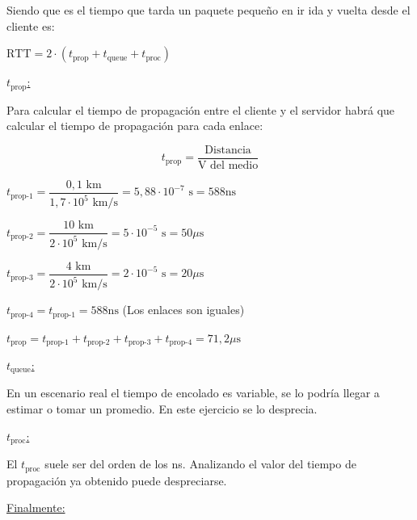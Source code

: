 Siendo que es el tiempo que tarda un paquete pequeño en ir ida y vuelta desde el cliente es:

\vspace{0.5\baselineskip}
\hfil
{\large
$\text{RTT} =
2 \cdot \left(t_{\text{prop}} + t_{\text{queue}} + t_{\text{proc}} \right)$
}
\hfil

{
\noindent\large
\underline{$t_{\text{prop}}$:}
}

\skipline
Para calcular el tiempo de propagación entre el cliente y el servidor habrá que calcular el tiempo de propagación para cada enlace:

$$t_{\text{prop}} = \dfrac{\text{Distancia}}{\text{V del medio}}$$

$t_{\text{prop-1}} =
\dfrac{0,1\text{ km}}{1,7\cdot 10^5\text{ km}/\text{s}} =
5,88 \cdot 10^{-7}\text{ s} = 588\text{ns}$

\vspace{0.5\baselineskip}
$t_{\text{prop-2}} =
\dfrac{10\text{ km}}{2\cdot 10^5\text{ km}/\text{s}} =
5 \cdot 10^{-5}\text{ s} = 50\mu\text{s}$

\vspace{0.5\baselineskip}
$t_{\text{prop-3}} =
\dfrac{4\text{ km}}{2\cdot 10^5\text{ km}/\text{s}} =
2 \cdot 10^{-5}\text{ s} = 20\mu\text{s}$

\vspace{0.5\baselineskip}
$t_{\text{prop-4}} = t_{\text{prop-1}} = 588\text{ns}$ (Los enlaces son iguales)

\vspace{\baselineskip}
$t_{\text{prop}} =
t_{\text{prop-1}} + t_{\text{prop-2}} + t_{\text{prop-3}}+ t_{\text{prop-4}} = 71,2 \mu\text{s}$


\skipline
{
\noindent\large
\underline{$t_{\text{queue}}$:}
}

\skipline
En un escenario real el tiempo de encolado es variable, se lo podría llegar a estimar o tomar un promedio. En este ejercicio se lo desprecia.


\skipline
{
\noindent\large
\underline{$t_{\text{proc}}$:}
}

\skipline
El $t_{\text{proc}}$ suele ser del orden de los ns. Analizando el valor del tiempo de propagación ya obtenido puede despreciarse.

\skipline
\noindent
\underline{Finalmente:}

\hfil
{}
\hfil



